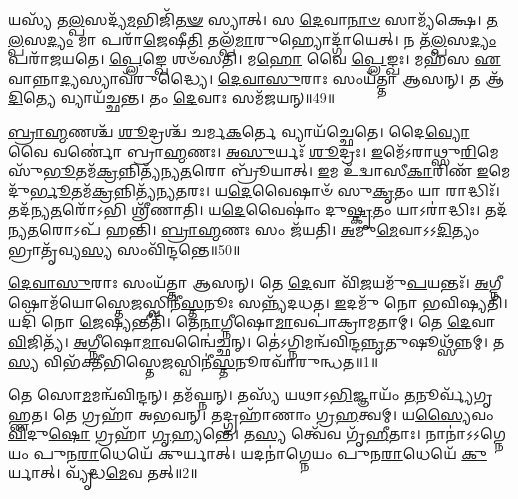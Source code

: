 𑌯𑌸𑍍𑌯᳴ 𑌤\-\ul{𑌲𑍍𑌪}\-𑌸𑌦𑍍𑌯᳴\-\ul{𑌮}\-𑌭𑌿𑌜𑌿᳴\-\ul{𑌤}\-\-\ul{𑍟} 𑌸𑍍𑌯𑌾𑌤𑍍।
𑌸 \ul{𑌦𑍇}\-𑌵𑌾\-\ul{𑌨𑌾}\-\-\ul{𑍞} 𑌸𑌾𑌮𑍍𑌯᳴𑌕𑍍𑌷𑍇।
\-\ul{𑌤}\-\-\ul{𑌲𑍍𑌪}\-𑌸\-\ul{𑌦𑍍𑌯𑌂} 𑌮𑌾 𑌪𑌰𑌾᳴\-\ul{𑌜𑍇}\-𑌷𑍀\-\ul{𑌤𑌿} 𑌤𑌲𑍍𑌪᳴\-\ul{𑌮𑌾}\-𑌰𑍁𑌹𑍍𑌯𑍋𑌦𑍍𑌗𑌾᳴𑌯𑍇𑌤𑍍।
𑌨 𑌤᳴\-\ul{𑌲𑍍𑌪}\-𑌸\-\ul{𑌦𑍍𑌯𑌂} 𑌪𑌰𑌾᳴𑌜𑌯𑌤𑍇।
\-\ul{𑌪𑍍𑌲𑍇}\-𑌙𑍍𑌖𑍇 𑌶𑍞᳴𑌸𑌤𑌿।
𑌮\-\ul{𑌹𑍋} 𑌵𑍈 \ul{𑌪𑍍𑌲𑍇}\-𑌙𑍍𑌖𑌃।
𑌮𑌹᳴𑌸 \ul{𑌏}\-𑌵𑌾𑌨𑍍𑌨𑌾\-\ul{𑌦𑍍𑌯}\-𑌸𑍍𑌯𑌾𑌵᳴𑌰𑍁𑌦𑍍𑌧𑍍𑌯𑍈।
\-\ul{𑌦𑍇}\-\-\ul{𑌵𑌾}\-\-\ul{𑌸𑍁}\-𑌰𑌾𑌃 𑌸𑌂𑌯᳴𑌤𑍍𑌤𑌾 𑌆𑌸𑌨𑍍।
𑌤 𑌆᳴\-\ul{𑌦𑌿}\-𑌤𑍍𑌯𑍇 𑌵𑍍𑌯𑌾𑌯᳴𑌚𑍍𑌛𑌨𑍍𑌤।
𑌤𑌂 \ul{𑌦𑍇}\-𑌵𑌾𑌃 𑌸𑌮᳴𑌜𑌯𑌨𑍍॥49॥

\-\ul{𑌬𑍍𑌰𑌾}\-\-\ul{𑌹𑍍𑌮}\-𑌣𑌶𑍍𑌚᳴ \ul{𑌶𑍂}\-𑌦𑍍𑌰𑌶𑍍𑌚᳴ 𑌚𑌰𑍍𑌮\-\ul{𑌕}\-𑌰𑍍𑌤𑍇 𑌵𑍍𑌯𑌾𑌯᳴𑌚𑍍𑌛𑍇𑌤𑍇।
𑌦𑍈\-\ul{𑌵𑍍𑌯𑍋} 𑌵𑍈 𑌵𑌰𑍍𑌣𑍋॑ 𑌬𑍍𑌰𑌾\-\ul{𑌹𑍍𑌮}\-𑌣𑌃।
\-\ul{𑌅}\-\-\ul{𑌸𑍁}\-𑌰𑍍𑌯𑌃᳴ \ul{𑌶𑍂}\-𑌦𑍍𑌰𑌃।
\-\ul{𑌇}\-𑌮𑍇᳴\-𑌽𑌰𑌾𑌥𑍍𑌸𑍁\-\ul{𑌰𑌿}\-𑌮𑍇 𑌸𑍁᳴\-\ul{𑌭𑍂}\-𑌤𑌮᳴\-\ul{𑌕𑍍𑌰}\-𑌨𑍍𑌨𑌿𑌤𑍍𑌯᳴𑌨𑍍𑌯\-\ul{𑌤}\-𑌰𑍋 𑌬𑍍𑌰𑍂᳴𑌯𑌾𑌤𑍍।
\-\ul{𑌇}\-𑌮 𑌉᳴𑌦𑍍𑌵𑌾𑌸𑍀\-\ul{𑌕𑌾}\-𑌰𑌿𑌣᳴ \ul{𑌇}\-𑌮𑍇 𑌦𑍁᳴\-\ul{𑌰𑍍𑌭𑍂}\-𑌤𑌮᳴\-\ul{𑌕𑍍𑌰}\-𑌨𑍍𑌨𑌿𑌤𑍍𑌯᳴𑌨𑍍𑌯\-\ul{𑌤}\-𑌰𑌃।
𑌯\-\ul{𑌦𑍇}\-𑌵𑍈𑌷𑌾𑍞᳴ 𑌸𑍁\-\ul{𑌕𑍃}\-𑌤𑌂 𑌯𑌾 𑌰𑌾𑌦𑍍𑌧𑌿𑌃᳴।
𑌤𑌦᳴𑌨𑍍𑌯\-\ul{𑌤}\-𑌰𑍋᳴𑌽𑌭𑌿 𑌶𑍍𑌰𑍀᳴𑌣𑌾𑌤𑌿।
𑌯\-\ul{𑌦𑍇}\-𑌵𑍈𑌷𑌾𑌂॑ 𑌦𑍁\-\ul{𑌷𑍍𑌕𑍃}\-𑌤𑌂 𑌯𑌾𑌽𑌰𑌾॑𑌦𑍍𑌧𑌿𑌃।
𑌤𑌦᳴𑌨𑍍𑌯\-\ul{𑌤}\-𑌰𑍋𑌽𑌪᳴ 𑌹𑌨𑍍𑌤𑌿।
\-\ul{𑌬𑍍𑌰𑌾}\-\-\ul{𑌹𑍍𑌮}\-𑌣𑌃 𑌸𑌂 𑌜᳴𑌯𑌤𑌿।
\-\ul{𑌅}\-𑌮𑍁\-\ul{𑌮𑍇}\-𑌵𑌾𑌽𑌽\-\ul{𑌦𑌿}\-𑌤𑍍𑌯𑌂 𑌭𑍍𑌰𑌾𑌤𑍃᳴𑌵𑍍𑌯\-\ul{𑌸𑍍𑌯} 𑌸𑌂𑌵𑌿᳴𑌨𑍍𑌦𑌨𑍍𑌤𑍇॥50॥




\clearpage
{}
\setcounter{anuvakam}{0}

\-\ul{𑌦𑍇}\-\-\ul{𑌵𑌾}\-\-\ul{𑌸𑍁}\-𑌰𑌾𑌃 𑌸𑌂𑌯᳴𑌤𑍍𑌤𑌾 𑌆𑌸𑌨𑍍।
𑌤𑍇 \ul{𑌦𑍇}\-𑌵𑌾 𑌵𑌿᳴\-\ul{𑌜}\-𑌯𑌮𑍁᳴\-\ul{𑌪}\-𑌯𑌨𑍍𑌤𑌃᳴।
\-\ul{𑌅}\-𑌗𑍍𑌨𑍀𑌷𑍋𑌮᳴𑌯𑍋𑌸𑍍𑌤𑍇\-\ul{𑌜}\-𑌸𑍍𑌵𑌿𑌨𑍀॑\-\ul{𑌸𑍍𑌤}\-𑌨𑍂𑌃 𑌸𑌨𑍍𑌨𑍍𑌯᳴𑌦𑌧𑌤।
\-\ul{𑌇}\-𑌦𑌮𑍁᳴ 𑌨𑍋 𑌭𑌵𑌿𑌷𑍍𑌯𑌤𑌿।
𑌯𑌦𑌿᳴ 𑌨𑍋 \ul{𑌜𑍇}\-𑌷𑍍𑌯𑌨𑍍𑌤𑍀𑌤𑌿᳴।
𑌤𑍇\-\ul{𑌨𑌾}\-𑌗𑍍𑌨𑍀𑌷𑍋\-\ul{𑌮𑌾}\-𑌵𑌪𑌾॑𑌕𑍍𑌰𑌾𑌮𑌤𑌾𑌮𑍍।
𑌤𑍇 \ul{𑌦𑍇}\-𑌵𑌾 \ul{𑌵𑌿}\-𑌜𑌿𑌤𑍍𑌯᳴।
\-\ul{𑌅}\-𑌗𑍍𑌨𑍀𑌷𑍋\-\ul{𑌮𑌾}\-𑌵𑌨𑍍𑌵𑍈॑𑌚𑍍𑌛𑌨𑍍।
𑌤𑍇॑𑌽𑌗𑍍𑌨𑌿𑌮𑌨𑍍𑌵᳴\-𑌵𑌿𑌨𑍍𑌦\-\ul{𑌨𑍍𑌨𑍃}\-𑌤𑍁𑌷𑍂𑌥𑍍𑌸᳴𑌨𑍍𑌨𑌮𑍍।
𑌤\-\ul{𑌸𑍍𑌯} 𑌵𑌿𑌭᳴𑌕𑍍𑌤𑍀𑌭𑌿𑌸𑍍𑌤𑍇\-\ul{𑌜}\-𑌸𑍍𑌵𑌿𑌨𑍀॑\-\ul{𑌸𑍍𑌤}\-𑌨𑍂\-𑌰𑌵𑌾᳴𑌰𑍁𑌨𑍍𑌧𑌤॥1॥

𑌤𑍇 𑌸𑍋\-\ul{𑌮}\-𑌮𑌨𑍍𑌵᳴𑌵𑌿𑌨𑍍𑌦𑌨𑍍।
𑌤𑌮᳴𑌘𑍍𑌨𑌨𑍍।
𑌤𑌸𑍍𑌯᳴ 𑌯𑌥𑌾\-𑌽\-\ul{𑌭𑌿}\-𑌜𑍍𑌞𑌾𑌯𑌂᳴ \ul{𑌤}\-𑌨𑍂𑌰𑍍𑌵𑍍𑌯᳴𑌗𑍃𑌹𑍍𑌣𑌤।
𑌤𑍇 𑌗𑍍𑌰𑌹𑌾᳴ 𑌅𑌭𑌵𑌨𑍍।
𑌤𑌦𑍍𑌗𑍍𑌰𑌹𑌾᳴𑌣𑌾𑌂 𑌗𑍍𑌰\-\ul{𑌹}\-𑌤𑍍𑌵𑌮𑍍।
𑌯\-\ul{𑌸𑍍𑌯𑍈}\-𑌵𑌂 \ul{𑌵𑌿}\-𑌦𑍁\-\ul{𑌷𑍋} 𑌗𑍍𑌰𑌹𑌾᳴ \ul{𑌗𑍃}\-𑌹𑍍𑌯𑌨𑍍𑌤𑍇॑।
𑌤\-\ul{𑌸𑍍𑌯} 𑌤𑍍𑌵𑍇᳴𑌵 𑌗𑍃᳴\-\ul{𑌹𑍀}\-𑌤𑌾𑌃।
𑌨𑌾𑌨𑌾॑\-𑌽𑌽𑌗𑍍𑌨𑍇𑌯𑌂 𑌪𑍁𑌨\-\ul{𑌰𑌾}\-𑌧𑍇𑌯𑍇᳴ 𑌕𑍁𑌰𑍍𑌯𑌾𑌤𑍍।
𑌯𑌦𑌨𑌾॑𑌗𑍍𑌨𑍇𑌯𑌂 𑌪𑍁𑌨\-\ul{𑌰𑌾}\-𑌧𑍇𑌯𑍇᳴ \ul{𑌕𑍁}\-𑌰𑍍𑌯𑌾𑌤𑍍।
𑌵𑍍𑌯𑍃᳴𑌦𑍍𑌧\-\ul{𑌮𑍇}\-𑌵 𑌤𑌤𑍍॥2॥


